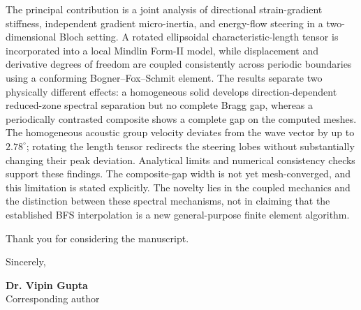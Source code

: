 \documentclass[10pt,a4paper]{article}
\begin{document}
The principal contribution is a joint analysis of directional strain-gradient stiffness, independent gradient micro-inertia, and energy-flow steering in a two-dimensional Bloch setting. A rotated ellipsoidal characteristic-length tensor is incorporated into a local Mindlin Form-II model, while displacement and derivative degrees of freedom are coupled consistently across periodic boundaries using a conforming Bogner--Fox--Schmit element. The results separate two physically different effects: a homogeneous solid develops direction-dependent reduced-zone spectral separation but no complete Bragg gap, whereas a periodically contrasted composite shows a complete gap on the computed meshes. The homogeneous acoustic group velocity deviates from the wave vector by up to $2.78^\circ$; rotating the length tensor redirects the steering lobes without substantially changing their peak deviation. Analytical limits and numerical consistency checks support these findings. The composite-gap width is not yet mesh-converged, and this limitation is stated explicitly. The novelty lies in the coupled mechanics and the distinction between these spectral mechanisms, not in claiming that the established BFS interpolation is a new general-purpose finite element algorithm.


Thank you for considering the manuscript.

Sincerely,

\textbf{Dr. Vipin Gupta}\\
Corresponding author
\end{document}
